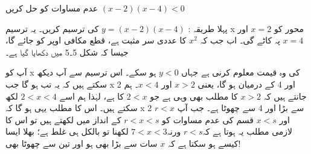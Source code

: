 

عدم مساوات کو حل کریں \((x-2)(x-4)<0\)

پہلا طریقہ : \(y=(x-2)(x-4)\) کی ترسیم کریں۔ یہ ترسیم x محور کو \(x=2\) اور \(x=4\) پہ کاٹے گی۔ اب جب کہ \(x^2\) کا عددی سر مثبت ہے، قطع مکافی اوپر کو جائے گا، جیسا کہ شکل 5۔5 میں دکھایا گیا ہے۔

آپ کو  x کی وہ قیمت معلوم کرنی ہے جہاں \(y<0\) ہو سکے۔
اس ترسیم سے آپ دیکھ سکتے ہیں کہ یہ تب ہو گا جب x  2 اور 4 کے درمیان ہو گا، یعنی \(x>2\) اور \(x<4\)۔
ہم جانتے ہیں کہ \(x>2\)  کا مطلب بھی وہی ہے جو \(2<x\) کا ہے، لہٰذا ہم اسے \(2<x<4\) لکھ سکتے ہیں۔ اس کا مطلب یہی ہو گا کہ x 2 سے بڑا اور 4 سے چھوٹا ہے۔
جب آپ \(r<x\) اور \(x<s\) قسم کی عدم مساوات کو \(r<x<s\) کے انداز میں لکھتے ہیں تو اس کا لازمی مطلب یہ ہوتا ہے کہ\(r<s\) ورنہ\(7<x<3\) لکھنا تو بالکل ہی غلط ہے؛ بھلا ایسا کیسے ہو سکتا ہے کہ  \(x\)  سات  سے بڑا بھی ہو اور تین سے چھوٹا بھی!

\kshortcut

